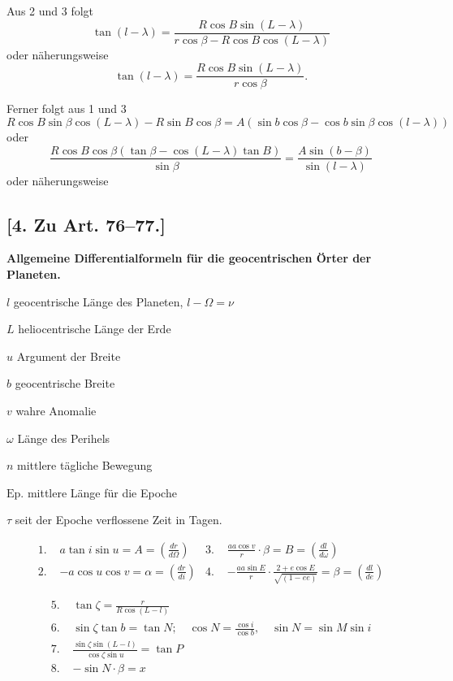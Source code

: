 \documentclass[12pt,a4paper]{article}
\begin{document}
\newpage

Aus 2 und 3 folgt
\[
\tan(l - \lambda) = \frac{R\cos B \sin(L - \lambda)}{r\cos\beta - R\cos B \cos(L - \lambda)}
\]
oder n\"aherungsweise
\begin{equation}\tag{4}
\tan(l - \lambda) = \frac{R\cos B \sin(L - \lambda)}{r\cos\beta}.
\end{equation}

Ferner folgt aus 1 und 3
\[
R\cos B \sin\beta \cos(L - \lambda) - R\sin B \cos\beta = A(\sin b \cos\beta - \cos b \sin\beta \cos(l - \lambda))
\]
oder
\begin{equation}\tag{5}
\frac{R\cos B \cos\beta(\tan\beta - \cos(L - \lambda)\tan B)}{\sin\beta} = \frac{A\sin(b - \beta)}{\sin(l - \lambda)}
\end{equation}
oder n\"aherungsweise

\subsection*{[4. Zu Art. 76--77.]}
\textbf{Allgemeine Differentialformeln f\"ur die geocentrischen \"Orter der Planeten.}

$l$ geocentrische L\"ange des Planeten, $l - \Omega = \nu$

$L$ heliocentrische L\"ange der Erde

$u$ Argument der Breite

$b$ geocentrische Breite

$v$ wahre Anomalie

$\omega$ L\"ange des Perihels

$n$ mittlere t\"agliche Bewegung

$\text{Ep.}$ mittlere L\"ange f\"ur die Epoche

$\tau$ seit der Epoche verflossene Zeit in Tagen.

\begin{align*}
\text{1. } & a\tan i \sin u = A = \left(\frac{dr}{d\Omega}\right) &
\text{3. } & \frac{aa\cos v}{r} \cdot \beta = B = \left(\frac{dl}{d\omega}\right) \\
\text{2. } & -a\cos u \cos v = \alpha = \left(\frac{dr}{di}\right) &
\text{4. } & -\frac{aa\sin E}{r} \cdot \frac{2 + e\cos E}{\sqrt{(1 - ee)}} = \beta = \left(\frac{dl}{de}\right)
\end{align*}

\begin{align*}
\text{5. } & \tan\zeta = \frac{r}{R\cos(L - l)} \\
\text{6. } & \sin\zeta \tan b = \tan N; \quad \cos N = \frac{\cos i}{\cos b}, \quad \sin N = \sin M \sin i \\
\text{7. } & \frac{\sin\zeta \sin(L - l)}{\cos\zeta \sin u} = \tan P \\
\text{8. } & -\sin N \cdot \beta = x
\end{align*}
\end{document}

